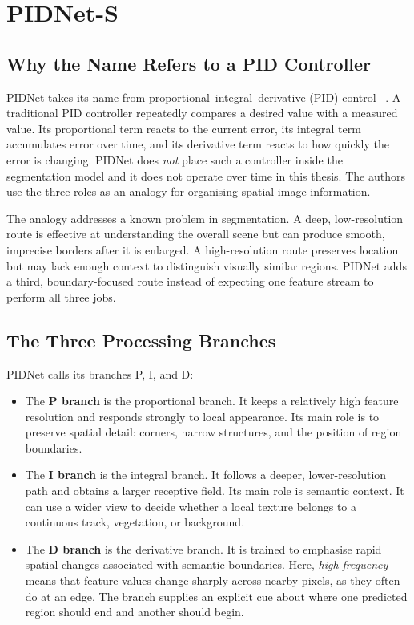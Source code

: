 \section{PIDNet-S}
\label{sec:pidnet_background}

\subsection{Why the Name Refers to a PID Controller}

PIDNet takes its name from proportional--integral--derivative (PID) control
~\cite{xu2023pidnet}. A traditional PID controller repeatedly compares a
desired value with a measured value. Its proportional term reacts to the
current error, its integral term accumulates error over time, and its
derivative term reacts to how quickly the error is changing. PIDNet does
\emph{not} place such a controller inside the segmentation model and it does
not operate over time in this thesis. The authors use the three roles as an
analogy for organising spatial image information.

The analogy addresses a known problem in segmentation. A deep,
low-resolution route is effective at understanding the overall scene but can
produce smooth, imprecise borders after it is enlarged. A high-resolution route
preserves location but may lack enough context to distinguish visually similar
regions. PIDNet adds a third, boundary-focused route instead of expecting one
feature stream to perform all three jobs.

\subsection{The Three Processing Branches}

PIDNet calls its branches P, I, and D:

\begin{itemize}
  \item The \textbf{P branch} is the proportional branch. It keeps a relatively
  high feature resolution and responds strongly to local appearance. Its main
  role is to preserve spatial detail: corners, narrow structures, and the
  position of region boundaries.
  \item The \textbf{I branch} is the integral branch. It follows a deeper,
  lower-resolution path and obtains a larger receptive field. Its main role is
  semantic context. It can use a wider view to decide whether a local texture
  belongs to a continuous track, vegetation, or background.
  \item The \textbf{D branch} is the derivative branch. It is trained to
  emphasise rapid spatial changes associated with semantic boundaries. Here,
  \emph{high frequency} means that feature values change sharply across nearby
  pixels, as they often do at an edge. The branch
  supplies an explicit cue about where one predicted region should end and
  another should begin.
\end{itemize}

